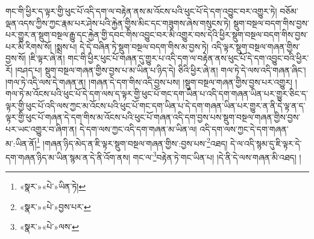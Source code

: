 གང་གི་ཕྱིར་ད་ལྟར་གྱི་ཕུང་པོ་འདི་དག་ལ་བརྟེན་ནས་མ་འོངས་པའི་ཕུང་པོ་དེ་དག་འབྱུང་བར་འགྱུར་ཏེ། བཅོམ་ལྡན་འདས་ཀྱིས་ཀྱང་རྣམ་པར་ཤེས་པའི་རྐྱེན་གྱིས་མིང་དང་གཟུགས་ཞེས་གསུངས་ཏེ། སྡུག་བསྔལ་བདག་གིས་བྱས་པར་གྱུར་ན་སྡུག་བསྔལ་རྒྱུ་དང་རྐྱེན་གྱི་དབང་གིས་འབྱུང་བར་མི་འགྱུར་བས་དེའི་ཕྱིར་སྡུག་བསྔལ་བདག་གིས་བྱས་པར་མི་རིགས་སོ། །སྨྲས་པ། དེ་དེ་བཞིན་ཏེ་སྡུག་བསྔལ་བདག་གིས་མ་བྱས་ཏེ། འདི་ལྟར་སྡུག་བསྔལ་གཞན་གྱིས་བྱས་སོ། །ཇི་ལྟར་ཞེ་ན། གང་གི་ཕྱིར་ཕུང་པོ་གཞན་དུ་གྱུར་པ་འདི་དག་ལ་བརྟེན་ནས་ཕུང་པོ་དེ་དག་འབྱུང་བའི་ཕྱིར་རོ། །བཤད་པ། སྡུག་བསྔལ་གཞན་གྱིས་བྱས་པ་མ་ཡིན་པ་ཉིད་དེ། ཅིའི་ཕྱིར་ཞེ་ན། གལ་ཏེ་དེ་ལས་འདི་གཞན་ཞིང་། །གལ་ཏེ་འདི་ལས་དེ་གཞན་ན། །གཞན་དེ་དག་གིས་འདི་བྱས་པས། །སྡུག་བསྔལ་གཞན་གྱིས་བྱས་པར་འགྱུར། །གལ་ཏེ་མ་འོངས་པའི་ཕུང་པོ་དེ་དག་ལས་ད་ལྟར་གྱི་ཕུང་པོ་གང་དག་ཡིན་པ་འདི་དག་གཞན་ཡིན་པར་གྱུར་ཅིང་ད་ལྟར་གྱི་ཕུང་པོ་འདི་ལས་ཀྱང་མ་འོངས་པའི་ཕུང་པོ་གང་དག་ཡིན་པ་དེ་དག་གཞན་ཡིན་པར་གྱུར་ན་ནི་དེ་ལྟ་ན་ད་ལྟར་གྱི་ཕུང་པོ་གཞན་དེ་དག་གིས་མ་འོངས་པའི་ཕུང་པོ་གཞན་འདི་དག་བྱས་པས་སྡུག་བསྔལ་གཞན་གྱིས་བྱས་པར་ཡང་འགྱུར་བ་ཞིག་ན། དེ་དག་ལས་ཀྱང་འདི་དག་གཞན་མ་ཡིན་ལ། འདི་དག་ལས་ཀྱང་དེ་དག་གཞན་མ་:ཡིན་ནོ།\footnote{«སྣར་»«པེ་»ཡིན་ཏེ།} །གཞན་ཉིད་མེད་ན་ཇི་ལྟར་སྡུག་བསྔལ་གཞན་གྱིས་:བྱས་པས་\footnote{«སྣར་»«པེ་»བྱས་པར་}འཐད། དེ་ལ་འདི་སྙམ་དུ་ཇི་ལྟར་དེ་དག་གཞན་ཉིད་མ་ཡིན་སྙམ་ན་དེ་ནི་འོག་ནས། གང་ལ་\footnote{«སྣར་»«པེ་»ལས་}བརྟེན་ཏེ་གང་ཡིན་པ། །དེ་ནི་དེ་ལས་གཞན་མི་འཐད། །
